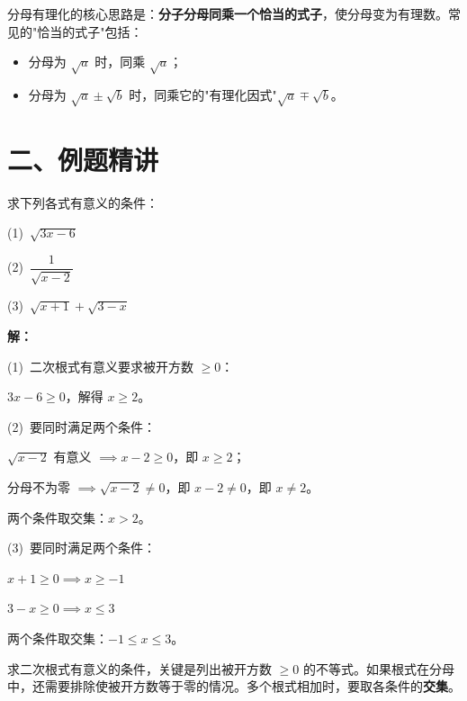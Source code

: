 \documentclass[12pt, a4paper]{ctexart}
\begin{document}
\begin{tipbox}[分母有理化的关键]
分母有理化的核心思路是：\textbf{分子分母同乘一个恰当的式子}，使分母变为有理数。常见的"恰当的式子"包括：
\begin{itemize}[leftmargin=2em]
  \item 分母为 $\sqrt{a}$ 时，同乘 $\sqrt{a}$；
  \item 分母为 $\sqrt{a} \pm \sqrt{b}$ 时，同乘它的"有理化因式"$\sqrt{a} \mp \sqrt{b}$。
\end{itemize}
\end{tipbox}

\section*{\textcolor{examorange}{二、例题精讲}}

\begin{examplebox}[【例题1】二次根式有意义的条件]
求下列各式有意义的条件：

\medskip
(1)\ $\sqrt{3x - 6}$

\medskip
(2)\ $\dfrac{1}{\sqrt{x-2}}$

\medskip
(3)\ $\sqrt{x+1} + \sqrt{3-x}$

\bigskip
\textbf{解：}

(1)\ 二次根式有意义要求被开方数 $\geqslant 0$：

$3x - 6 \geqslant 0$，解得 $x \geqslant 2$。

\medskip
(2)\ 要同时满足两个条件：

$\sqrt{x-2}$ 有意义 $\implies x - 2 \geqslant 0$，即 $x \geqslant 2$；

分母不为零 $\implies \sqrt{x-2} \neq 0$，即 $x - 2 \neq 0$，即 $x \neq 2$。

两个条件取交集：$x > 2$。

\medskip
(3)\ 要同时满足两个条件：

$x + 1 \geqslant 0 \implies x \geqslant -1$

$3 - x \geqslant 0 \implies x \leqslant 3$

两个条件取交集：$-1 \leqslant x \leqslant 3$。
\end{examplebox}

\begin{tipbox}[方法总结]
求二次根式有意义的条件，关键是列出被开方数 $\geqslant 0$ 的不等式。如果根式在分母中，还需要排除使被开方数等于零的情况。多个根式相加时，要取各条件的\textbf{交集}。
\end{tipbox}
\end{document}
